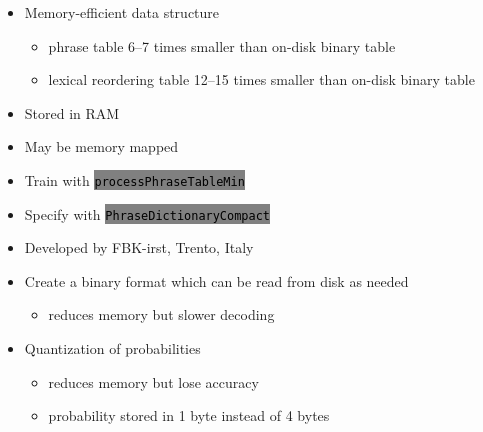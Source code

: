 \documentclass[landscape]{uedslides2C}
\newcommand{\littlecode}[1]{\colorbox{gray}{\textcolor{black}{\small \tt #1}}}
\begin{document}

\begin{itemize}
\item Memory-efficient data structure
\begin{itemize}
\item phrase table 6--7 times smaller than on-disk binary table
\item lexical reordering table 12--15 times smaller than on-disk binary table
\end{itemize}
\item Stored in RAM
\item May be memory mapped
\item Train with \littlecode{processPhraseTableMin}
\item Specify with \littlecode{PhraseDictionaryCompact}
\end{itemize}


\vspace{20mm}
\begin{itemize}
\item Developed by FBK-irst, Trento, Italy
\item Create a binary format which can be read from disk as needed
	\begin{itemize}
	\item reduces memory but slower decoding 
	\end{itemize}
\item Quantization of probabilities
	\begin{itemize}
	\item reduces memory but lose accuracy
	\item probability stored in 1 byte instead of 4 bytes
	\end{itemize}
\end{itemize}

\end{document}
